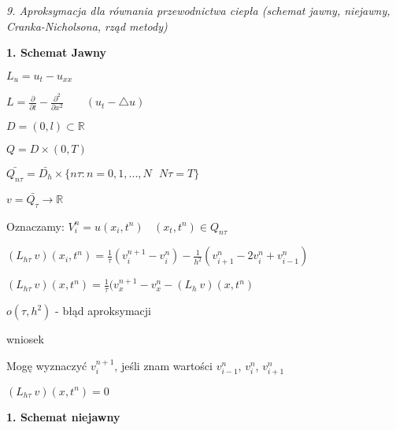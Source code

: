 \textit{9. Aproksymacja dla równania przewodnictwa ciepła (schemat jawny, niejawny, Cranka-Nicholsona, rząd metody)}

\textbf{1. Schemat Jawny}

$L_u = u_t - u_{xx}$

$L = \frac{\partial}{\partial t} - \frac{\partial^2}{\partial x^2}\ \ \ \ \ \ \ \ \ (u_t - \bigtriangleup u)$

$D = (0,l) \subset \mathbb{R}$

$Q = D \times (0,T)$

$\bar{Q_{n\tau}} = \bar{D_h} \times \{ n\tau : n = 0, 1, ..., N\ \ \ N\tau = T\}$

$v = \bar{Q_\tau} \rightarrow \mathbb{R}$

Oznaczamy: $V^n_i = u(x_i,t^n)\ \ \ \ (x_t,t^n) \in Q_{n\tau}$

$(L_{h\tau}\ v)(x_i, t^n) = \frac{1}{\tau} (v^{n+1}_i - v^n_i) - \frac{1}{h^2} (v^n_{i+1} - 2v^n_i + v^n_{i-1})$

$(L_{h\tau}\ v)(x, t^n) = \frac{1}{\tau} (v^{n+1}_x - v^n_x - (L_h\ v)(x, t^n)$

$o(\tau, h^2)$ - błąd aproksymacji

wniosek

Mogę wyznaczyć $v^{n+1}_i$, jeśli znam wartości $v^{n}_{i-1}$, $v^{n}_{i}$, $v^{n}_{i+1}$

$(L_{h\tau}\ v)(x, t^n) = 0$

\textbf{1. Schemat niejawny}